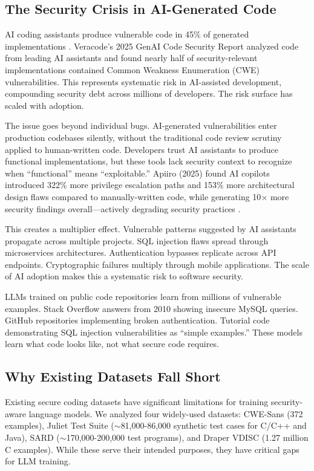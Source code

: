 \documentclass[11pt,letterpaper]{article}
\begin{document}
\subsection{The Security Crisis in AI-Generated Code}

AI coding assistants produce vulnerable code in 45\% of generated implementations \cite{veracode2025}. Veracode's 2025 GenAI Code Security Report analyzed code from leading AI assistants and found nearly half of security-relevant implementations contained Common Weakness Enumeration (CWE) vulnerabilities. This represents systematic risk in AI-assisted development, compounding security debt across millions of developers. The risk surface has scaled with adoption.

The issue goes beyond individual bugs. AI-generated vulnerabilities enter production codebases silently, without the traditional code review scrutiny applied to human-written code. Developers trust AI assistants to produce functional implementations, but these tools lack security context to recognize when ``functional'' means ``exploitable.'' Apiiro (2025) found AI copilots introduced 322\% more privilege escalation paths and 153\% more architectural design flaws compared to manually-written code, while generating 10$\times$ more security findings overall---actively degrading security practices \cite{apiiro2025}.

This creates a multiplier effect. Vulnerable patterns suggested by AI assistants propagate across multiple projects. SQL injection flaws spread through microservices architectures. Authentication bypasses replicate across API endpoints. Cryptographic failures multiply through mobile applications. The scale of AI adoption makes this a systematic risk to software security.

LLMs trained on public code repositories learn from millions of vulnerable examples. Stack Overflow answers from 2010 showing insecure MySQL queries. GitHub repositories implementing broken authentication. Tutorial code demonstrating SQL injection vulnerabilities as ``simple examples.'' These models learn what code looks like, not what secure code requires.

\subsection{Why Existing Datasets Fall Short}

Existing secure coding datasets have significant limitations for training security-aware language models. We analyzed four widely-used datasets: CWE-Sans (372 examples), Juliet Test Suite ($\sim$81,000-86,000 synthetic test cases for C/C++ and Java), SARD ($\sim$170,000-200,000 test programs), and Draper VDISC (1.27 million C examples). While these serve their intended purposes, they have critical gaps for LLM training.
\end{document}
